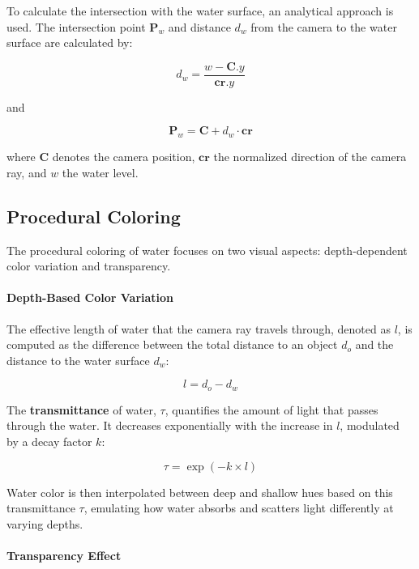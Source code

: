 To calculate the intersection with the water surface, an analytical approach is used. The intersection point $\mathbf{P}_w$ and distance $d_w$ from the camera to the water surface are calculated by:

\begin{equation}
d_{w} = \frac{w - \mathbf{C}.y}{\mathbf{cr}.y}
\end{equation}

and

\begin{equation}
\mathbf{P}_{w} = \mathbf{C} + d_{w}\cdot\mathbf{cr}
\end{equation}

where $\mathbf{C}$ denotes the camera position, $\mathbf{cr}$ the normalized direction of the camera ray, and $w$ the water level.

\subsection{Procedural Coloring}

The procedural coloring of water focuses on two visual aspects: depth-dependent color variation and transparency. 

\paragraph{Depth-Based Color Variation}
   
The effective length of water that the camera ray travels through, denoted as $l$, is computed as the difference between the total distance to an object $d_{o}$ and the distance to the water surface $d_{w}$:

\begin{equation}
   l = d_{o}-d_w
\end{equation}

The \textbf{transmittance} of water, $\tau$, quantifies the amount of light that passes through the water. It decreases exponentially with the increase in $l$, modulated by a decay factor $k$:

\begin{equation}
    \tau = \exp(-k \times l)
\end{equation}
   
Water color is then interpolated between deep and shallow hues based on this transmittance $\tau$, emulating how water absorbs and scatters light differently at varying depths.

\paragraph{Transparency Effect}

